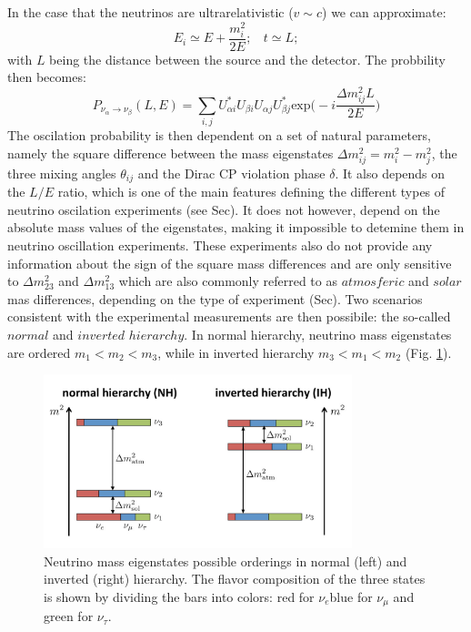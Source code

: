 \documentclass[12pt,a4paper,openright,twoside]{report}
\begin{document}
In the case that the neutrinos are ultrarelativistic ($v\sim c$) we can approximate:
\begin{equation}
E_i \simeq E + \frac{m_i^2}{2E}; \ \ \ \ t\simeq L;
\end{equation}
with $L$ being the distance between the source and the detector. The probbility then becomes:
\begin{equation}
P_{\nu_\alpha \rightarrow \nu_\beta}(L,E)=\sum_{i,j}U_{\alpha i}^* U_{\beta i} U_{\alpha j}U^*_{\beta j} \text{exp} \bigg(-i\frac{\Delta m_{ij}^2L}{2E}\bigg)
\end{equation}
The oscilation probability is then dependent on a set of natural parameters, namely the square difference between the mass eigenstates $\Delta m_{ij}^2=m_i^2-m_j^2$, the three mixing angles $\theta_{ij}$ and the Dirac CP violation phase $\delta$. It also depends on the $L/E$ ratio, which is one of the main features defining the different types of neutrino oscilation experiments (see Sec). It does not however, depend on the absolute mass values  of the eigenstates, making it impossible to detemine them in neutrino oscillation experiments. These experiments also do not provide any information about the sign of the square mass differences and are only sensitive to $\Delta m_{23}^2$ and $\Delta m_{13}^2$ which are also commonly referred to as $atmosferic$ and $solar$ mas differences, depending on the type of experiment (Sec). Two scenarios consistent with
the experimental measurements are then possibile:  the so-called $normal$ and $inverted$ $hierarchy$. In
normal hierarchy, neutrino mass eigenstates are ordered $m_1<m_2<m_3$, while in inverted
hierarchy $m_3<m_1<m_2$ (Fig. \ref{hierarchy:fig}). 
\begin{figure}
	\centering
	\includegraphics[width=0.8\textwidth]{mass-hierarchy.png}
	\caption{\label{hierarchy:fig}Neutrino mass eigenstates possible orderings in normal (left) and inverted (right) hierarchy. The flavor composition of the three states is shown by dividing the bars into colors: red for $\nu_e$blue for $\nu_\mu$ and green for $\nu_\tau$.}
\end{figure}
\end{document}
